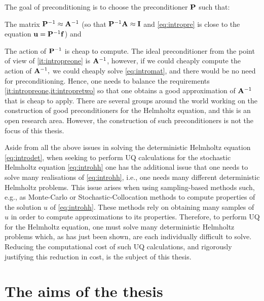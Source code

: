 The goal of preconditioning is to choose the preconditioner $\mathbf{P}$ such that:
\ben
\item\label{it:intropreone} The matrix $\mathbf{P}^{-1} \approx \mathbf{A}^{-1}$ (so that $\mathbf{P}^{-1}\mathbf{A} \approx \mathbf{I}$ and \eqref{eq:intropre} is close to the equation $\mathbf{u} = \mathbf{P}^{-1} \mathbf{f}$) and
\item\label{it:intropretwo} The action of $\mathbf{P}^{-1}$ is cheap to compute.
\een
The ideal preconditioner from the point of view of \cref{it:intropreone} is $\mathbf{A}^{-1}$, however, if we could cheaply compute the action of $\mathbf{A}^{-1},$ we could cheaply solve \eqref{eq:intromat}, and there would be no need for preconditioning. Hence, one needs to balance the requirements \cref{it:intropreone,it:intropretwo} so that one obtains a good approximation of $\mathbf{A}^{-1}$ that is cheap to apply. There are several groups around the world working on the construction of good preconditioners for the Helmholtz equation, and this is an open research area. However, the construction of such preconditioners is not the focus of this thesis.

Aside from all the above issues in solving the deterministic Helmholtz equation \eqref{eq:introdet}, when seeking to perform UQ calculations for the stochastic Helmholtz equation \eqref{eq:introhh} one has the additional issue that one needs to solve many realisations of \eqref{eq:introhh}, i.e., one needs many different deterministic Helmholtz problems. This issue arises when using sampling-based methods such, e.g., as Monte-Carlo or Stochastic-Collocation methods to compute properties of the solution $u$ of \eqref{eq:introhh}. These methods rely on obtaining many samples of $u$ in order to compute approximations to its properties. Therefore, to perform UQ for the Helmholtz equation, one must solve many deterministic Helmholtz problems which, as has just been shown, are each individually difficult to solve. Reducing the computational cost of such UQ calculations, and rigorously justifying this reduction in cost, is the subject of this thesis.

\section{The aims of the thesis}

